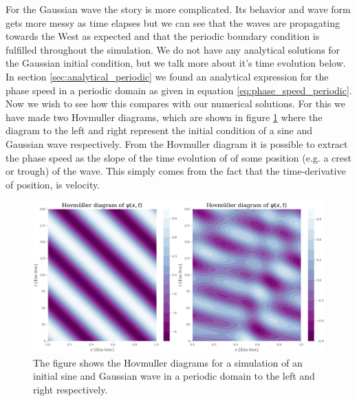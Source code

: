 \documentclass[12pt]{article}
\numberwithin{figure}{section}
\numberwithin{table}{section}
\begin{document}
\noindent For the Gaussian wave the story is more complicated. Its behavior and wave form gets more messy as time elapses but we can see that the waves are propagating towards the West as expected and that the periodic boundary condition is fulfilled throughout the simulation. We do not have any analytical solutions for the Gaussian initial condition, but we talk more about it's time evolution below.\\ 



\noindent In section \ref{sec:analytical_periodic} we found an analytical expression for the phase speed in a periodic domain as given in equation \eqref{eq:phase_speed_periodic}. Now we wish to see how this compares with our numerical solutions. For this we have made two Hovmuller diagrams, which are shown in figure \ref{fig:hovmuller_periodic} where the diagram to the left and right represent the initial condition of a sine and Gaussian wave respectively. From the Hovmuller diagram it is possible to extract the phase speed as the slope of the time evolution of of some position (e.g. a crest or trough) of the wave. This simply comes from the fact that the time-derivative of position, is velocity.\\ 



\begin{figure}[ht]
 \centerline{\includegraphics[scale = 0.45]{hovmuller_periodic_combined.png}}
 \caption{The figure shows the Hovmuller diagrams for a simulation of an initial sine and Gaussian wave in a periodic domain to the left and right respectively. }
 \label{fig:hovmuller_periodic}
\end{figure}
\end{document}
